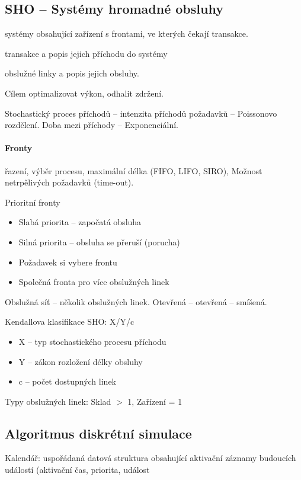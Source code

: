 \documentclass[a4wide]{report}
\begin{document}
\subsection{SHO -- Systémy hromadné obsluhy}

systémy obsahující zařízení s frontami, ve kterých čekají transakce.

transakce a popis jejich příchodu do systémy

obslužné linky a popis jejich obsluhy.

Cílem optimalizovat výkon, odhalit zdržení. 

Stochastický proces příchodů -- intenzita příchodů požadavků -- Poissonovo rozdělení. Doba mezi příchody -- Exponenciální.

\paragraph{Fronty} řazení, výběr procesu, maximální délka (FIFO, LIFO, SIRO), Možnost netrpělivých požadavků (time-out).

Prioritní fronty
\begin{itemize}
	\item Slabá priorita -- započatá obsluha
	\item Silná priorita -- obsluha se přeruší (porucha)
	\item Požadavek si vybere frontu
	\item Společná fronta pro více obslužných linek
\end{itemize}

Obslužná síť -- několik obslužných linek. Otevřená -- otevřená -- smíšená.

Kendallova klasifikace SHO: X/Y/c
\begin{itemize}
	\item X -- typ stochastického procesu příchodu
	\item Y -- zákon rozložení délky obsluhy
	\item c -- počet dostupných linek
\end{itemize}

Typy obslužných linek: Sklad $>$ 1, Zařízení = 1

\subsection{Algoritmus diskrétní simulace}

Kalendář: uspořádaná datová struktura obsahující aktivační záznamy budoucích událostí (aktivační čas, priorita, událost
\end{document}
